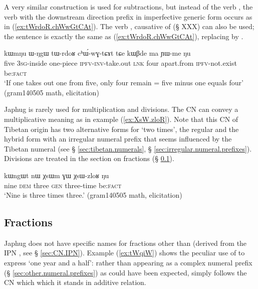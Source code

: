 A very similar construction is used for subtractions, but instead of the verb  , the verb  with the downstream direction prefix in imperfective generic form  occurs as in (\ref{ex:tWrdoR.chWwGtCAt}). The verb , causative of  (§ XXX) can also be used; the sentence is exactly the same as (\ref{ex:tWrdoR.chWwGtCAt}), replacing   by  .

\begin{exe}
\ex \label{ex:tWrdoR.chWwGtCAt}
\gll kɯmŋu ɯ-ŋgɯ tɯ-rdoʁ cʰɯ́-wɣ-tɕɤt tɕe kɯβde ma ɲɯ-me ŋu \\
 five \textsc{3sg}-inside one-piece \textsc{ipfv}-\textsc{inv}-take.out \textsc{lnk} four apart.from \textsc{ipfv}-not.exist be:\textsc{fact} \\
\glt `If one takes out one from five, only four remain = five minus one equals four' (gram140505 math, elicitation)
\end{exe}

Japhug is rarely used for multiplication and divisions. The CN  can convey a multiplicative meaning  as in example (\ref{ex:XsW.zloR}). Note that this CN of Tibetan origin has two alternative forms for `two times', the regular   and the hybrid form  with an irregular numeral prefix that seems influenced by the Tibetan numeral  (see § \ref{sec:tibetan.numerals}, § \ref{sec:irregular.numeral.prefixes}). Divisions are treated in the section on fractions (§ \ref{sec:fractions}).

\begin{exe}
\ex \label{ex:XsW.zloR}
\gll  kɯngɯt nɯ χsɯm ɣɯ χsɯ-zloʁ ŋu \\
 nine \textsc{dem} three \textsc{gen} three-time be:\textsc{fact} \\
\glt `Nine is three times three.' (gram140505 math, elicitation)
\end{exe}
 
 
\subsection{Fractions} \label{sec:fractions}
Japhug does not have specific names for fractions other than  (derived from the IPN , see § \ref{sec:CN.IPN}). Example (\ref{ex:tWqiW}) shows the peculiar use of  to express `one year and a half': rather than appearing as a complex numeral prefix (§ \ref{sec:other.numeral.prefixes}) as could have been expected,    simply follows the CN  which which it stands in additive relation.

